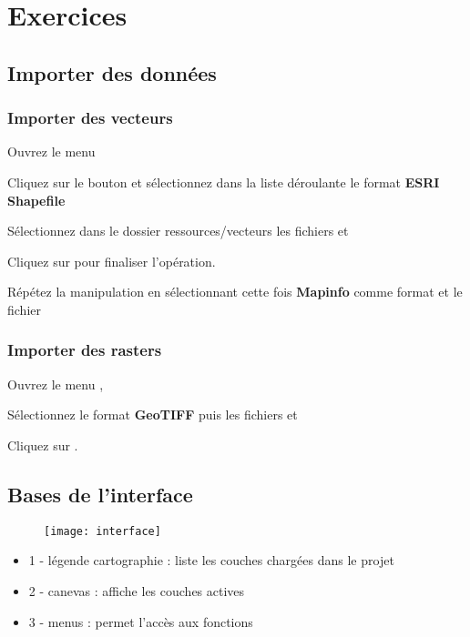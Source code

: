 \chapter{Exercices}

\section{Importer des données}

\subsection{Importer des vecteurs}

Ouvrez le menu  \arrow {}

Cliquez sur le bouton  et sélectionnez dans la liste déroulante le format \textbf{ESRI Shapefile}

Sélectionnez dans le dossier ressources/vecteurs les fichiers  et 

Cliquez sur  pour finaliser l'opération.

Répétez la manipulation en sélectionnant cette fois \textbf{Mapinfo} comme format et le fichier 

\subsection{Importer des rasters}

Ouvrez le menu \arrow{}, 

Sélectionnez le format \textbf{GeoTIFF} puis les fichiers  et  

Cliquez sur .

\section{Bases de l'interface}

\begin{figure}[ht]
   \centering
   \texttt{[image: interface]}
\end{figure}

\begin{itemize}
\item 1 - légende cartographie : liste les couches chargées dans le projet
\item 2 - canevas : affiche les couches actives
\item 3 - menus : permet l'accès aux fonctions
\end{itemize}

